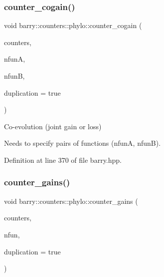 \subsubsection{\texorpdfstring{counter\+\_\+cogain()}{counter\_cogain()}}
{\footnotesize\ttfamily void barry\+::counters\+::phylo\+::counter\+\_\+cogain (\begin{DoxyParamCaption}\item[{\hyperlink{namespacebarry_1_1counters_1_1phylo_a4e401ffe66d04091343dcffaf915f8c3}{Phylo\+Counters} $\ast$}]{counters,  }\item[{\hyperlink{namespacebarry_a11dfc53ddb4672278319aa04f1e09a6c}{uint}}]{nfunA,  }\item[{\hyperlink{namespacebarry_a11dfc53ddb4672278319aa04f1e09a6c}{uint}}]{nfunB,  }\item[{bool}]{duplication = {\ttfamily true} }\end{DoxyParamCaption})\hspace{0.3cm}{\ttfamily [inline]}}



Co-\/evolution (joint gain or loss) 

Needs to specify pairs of functions ({\ttfamily nfunA}, {\ttfamily nfunB}). 

Definition at line 370 of file barry.\+hpp.

\mbox{\label{namespacebarry_1_1counters_1_1phylo_afc1215e596c2f5a5e3b6f39273427a9a}} 
\subsubsection{\texorpdfstring{counter\+\_\+gains()}{counter\_gains()}}
{\footnotesize\ttfamily void barry\+::counters\+::phylo\+::counter\+\_\+gains (\begin{DoxyParamCaption}\item[{\hyperlink{namespacebarry_1_1counters_1_1phylo_a4e401ffe66d04091343dcffaf915f8c3}{Phylo\+Counters} $\ast$}]{counters,  }\item[{std\+::vector$<$ \hyperlink{namespacebarry_a11dfc53ddb4672278319aa04f1e09a6c}{uint} $>$}]{nfun,  }\item[{bool}]{duplication = {\ttfamily true} }\end{DoxyParamCaption})\hspace{0.3cm}{\ttfamily [inline]}}



